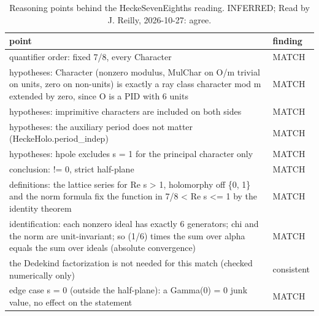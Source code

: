 \begin{table}[!htbp]
\caption{Reasoning points behind the HeckeSevenEighths reading. INFERRED; Read by J. Reilly, 2026-10-27: agree.}\label{tab:points-HeckeSevenEighths}
\scriptsize\setlength{\tabcolsep}{3pt}\renewcommand{\arraystretch}{0.95}
\begin{tabularx}{\textwidth}{@{}>{\raggedright\arraybackslash}Xl@{}}
\toprule
point & finding \\
\midrule
quantifier order: fixed 7/8, every Character & MATCH \\
hypotheses: Character (nonzero modulus, MulChar on O/m trivial on units, zero on non-units) is exactly a ray class character mod m extended by zero, since O is a PID with 6 units & MATCH \\
hypotheses: imprimitive characters are included on both sides & MATCH \\
hypotheses: the auxiliary period does not matter (HeckeHolo.period\_indep) & MATCH \\
hypotheses: hpole excludes s = 1 for the principal character only & MATCH \\
conclusion: != 0, strict half-plane & MATCH \\
definitions: the lattice series for Re s > 1, holomorphy off \{0, 1\} and the norm formula fix the function in 7/8 < Re s <= 1 by the identity theorem & MATCH \\
identification: each nonzero ideal has exactly 6 generators; chi and the norm are unit-invariant; so (1/6) times the sum over alpha equals the sum over ideals (absolute convergence) & MATCH \\
the Dedekind factorization is not needed for this match (checked numerically only) & consistent \\
edge case s = 0 (outside the half-plane): a Gamma(0) = 0 junk value, no effect on the statement & MATCH \\
\bottomrule
\end{tabularx}
\end{table}
